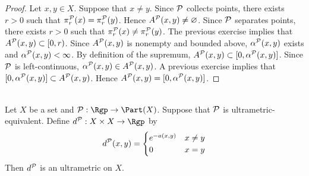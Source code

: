 \documentclass{book}
\begin{document}
\begin{proof}
	Let $x,y \in X$. Suppose that $x \neq y$. Since $\mathcal{P}$ collects points, there exists $r > 0$ such that $\pi^{\mathcal{P}}_r(x) = \pi^{\mathcal{P}}_r(y)$. Hence $A^{\mathcal{P}}(x,y) \neq \varnothing$. Since $\mathcal{P}$ separates points, there exists $r > 0$ such that $\pi^{\mathcal{P}}_r(x) \neq \pi^{\mathcal{P}}_r(y)$. The previous exercise implies that $A^{\mathcal{P}}(x,y) \subset [0, r)$. Since $A^{\mathcal{P}}(x,y)$ is nonempty and bounded above, $\alpha^{\mathcal{P}}(x,y)$ exists and $\alpha^{\mathcal{P}}(x,y) < \infty$. By definition of the supremum, $A^{\mathcal{P}}(x,y) \subset [0, \alpha^{\mathcal{P}}(x,y)]$. Since $\mathcal{P}$ is left-continuous, $\alpha^{\mathcal{P}}(x,y) \in A^{\mathcal{P}}(x,y)$. A previous exercise implies that $[0, \alpha^{\mathcal{P}}(x,y)] \subset A^{\mathcal{P}}(x,y)$. Hence $A^{\mathcal{P}}(x,y) = [0, \alpha^{\mathcal{P}}(x,y)]$.
\end{proof}

\begin{ex}  \\ 
	Let $X$ be a set and $\MP: \Rgp \rightarrow \Part(X)$. Suppose that $\mathcal{P}$ is ultrametric-equivalent. Define $d^{\MP}: X \times X \rightarrow \Rgp$ by 
	\[
	d^{\mathcal{P}}(x,y) =
	\begin{cases}
			e^{-a(x,y)} & x \neq y \\
			0 &  x = y
		\end{cases}
	\]
	Then $d^{\mathcal{P}}$ is an ultrametric on $X$.
\end{ex}
\end{document}
